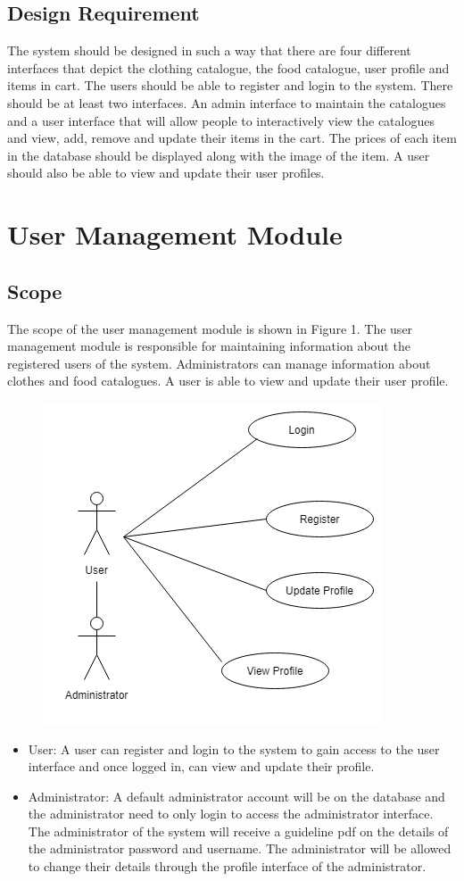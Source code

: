 \documentclass[12pt]{article}
\begin{document}
\subsection{Design Requirement}
The system should be designed in such a way that there are four different interfaces that depict the clothing
catalogue, the food catalogue, user profile and items in cart. The users should be able to register and login to the system.
There should be at least two interfaces. An admin interface to maintain the catalogues and a
user interface that will allow people to interactively view the catalogues and view, add,  remove  and update their items in the cart.
The prices of each item in the database should be displayed along with the image of the item.  A user should also be able to view and update their user profiles.


\section{User Management Module}
\subsection{Scope}
The scope of the user management module is shown in Figure 1. The user management module is responsible for maintaining information about the registered users of the system. Administrators can manage information about clothes and food catalogues. A user is able to view and update their user profile.   
\begin{figure}[h]
\centering
\includegraphics[scale=1]{diagrams/use.png}
\end{figure}
\begin{itemize}
\item User: A user can register and login to the system to gain access to the user interface and once logged in, can view and update their profile.
\item Administrator: A default administrator account will be on the database and the administrator need to only login to access the administrator interface. The administrator of the system will receive a guideline pdf on the details of the administrator password and username. The administrator will be allowed to change their details through the profile interface of the administrator.

\end{itemize}
\end{document}
